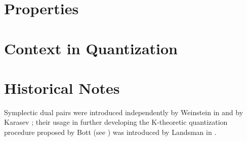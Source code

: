 \section{Properties}


\section{Context in Quantization}



\section{Historical Notes}
Symplectic dual pairs were introduced independently by Weinstein in \cite{weinsteindualpairs} and by Karasev \cite{karasev89}; their usage in further developing the K-theoretic quantization procedure proposed by Bott (see \cite{bottquant}) was introduced by Landsman in \cite{landsmankk}. %